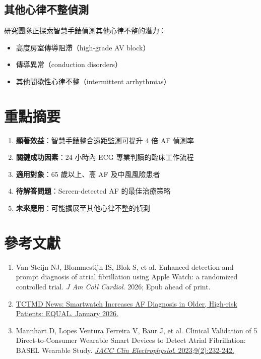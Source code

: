 \documentclass[12pt,a4paper]{article}
\begin{document}

\subsection{其他心律不整偵測}
研究團隊正探索智慧手錶偵測其他心律不整的潛力：
\begin{itemize}
    \item 高度房室傳導阻滯（high-grade AV block）
    \item 傳導異常（conduction disorders）
    \item 其他間歇性心律不整（intermittent arrhythmias）
\end{itemize}

\section{重點摘要}

\begin{enumerate}
    \item \textbf{顯著效益}：智慧手錶整合遠距監測可提升 4 倍 AF 偵測率
    \item \textbf{關鍵成功因素}：24 小時內 ECG 專業判讀的臨床工作流程
    \item \textbf{適用對象}：65 歲以上、高 AF 及中風風險患者
    \item \textbf{待解答問題}：Screen-detected AF 的最佳治療策略
    \item \textbf{未來應用}：可能擴展至其他心律不整的偵測
\end{enumerate}

\section{參考文獻}

\begin{enumerate}
    \item Van Steijn NJ, Blommestijn IS, Blok S, et al. Enhanced detection and prompt diagnosis of atrial fibrillation using Apple Watch: a randomized controlled trial. \textit{J Am Coll Cardiol}. 2026; Epub ahead of print.

    \item \href{https://www.tctmd.com/news/smartwatch-increases-af-diagnosis-older-high-risk-patients-equal}{TCTMD News: Smartwatch Increases AF Diagnosis in Older, High-risk Patients: EQUAL. January 2026.}

    \item Mannhart D, Lopes Ventura Ferreira V, Baur J, et al. Clinical Validation of 5 Direct-to-Consumer Wearable Smart Devices to Detect Atrial Fibrillation: BASEL Wearable Study. \href{https://doi.org/10.1016/j.jacep.2022.09.011}{\textit{JACC Clin Electrophysiol}. 2023;9(2):232-242.}
\end{enumerate}
\end{document}
